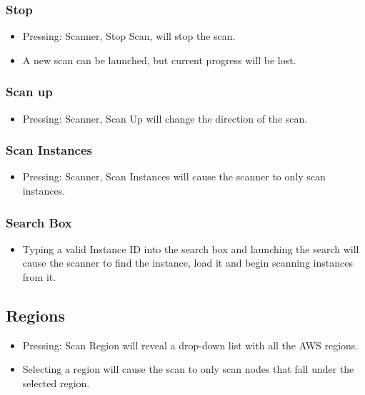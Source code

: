 \documentclass[hidelinks,a4paper,12pt]{article}
\begin{document}
	
	\subsubsection{Stop}
		\begin {itemize}
		\item Pressing: Scanner, Stop Scan, will stop the scan.
		\item A new scan can be launched, but current progress will be lost.
	\end{itemize}
	
	

	
	\subsubsection{Scan up}
			\begin {itemize}
			\item Pressing: Scanner, Scan Up will change the direction of the scan.
	\end{itemize}

	\subsubsection{Scan Instances}
	\begin {itemize}
	\item Pressing: Scanner, Scan Instances will cause the scanner to only scan instances.
	\end{itemize}

	\subsubsection{Search Box}
	\begin {itemize}
	\item Typing a valid Instance ID into the search box and launching the search will cause the scanner to find the instance, load it and begin scanning instances from it.
	\end{itemize}

	\newpage
		
	\subsection{Regions}
			\begin {itemize}
			\item Pressing: Scan Region will reveal a drop-down list with all the AWS regions. 
			\item Selecting a region will cause the scan to only scan nodes that fall under the selected region.
	\end{itemize}
		
\end{document}
